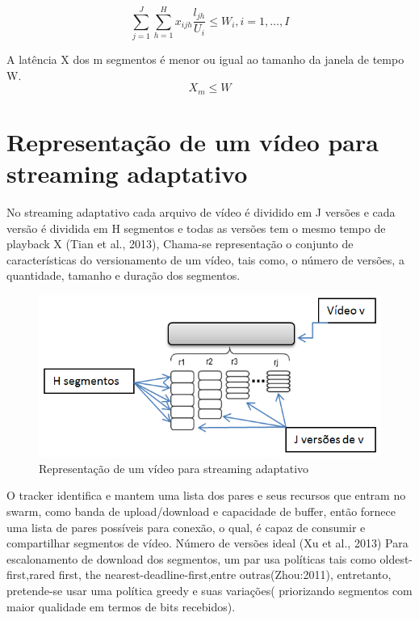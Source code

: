 \documentclass[
	12pt,				%
	oneside,			%
	a4paper,			%
	english,			%
	brazil				%
	]{abntex2ppgsi}
\begin{document}
\begin{equation}
\sum_{j=1}^J\sum_{h=1}^{H}x_{ijh}\frac{l_{jh}}{U_i} \leq W_i ,i = 1, \dots, I
\end{equation}

A latência X dos m segmentos é menor ou igual ao tamanho da janela de tempo W.
\begin{equation}
X_m \leq W
\end{equation}


\section{Representação de um vídeo para streaming adaptativo}

No streaming adaptativo cada arquivo de vídeo é dividido em J versões e cada versão é dividida em H segmentos e todas as versões tem o mesmo tempo de playback X (Tian et al., 2013), Chama-se representação o conjunto de características do versionamento de um vídeo, tais como, o número de versões, a quantidade, tamanho e duração dos segmentos.


\begin{figure}[H]%
	\centering
 	  \caption{Representação de um vídeo para streaming adaptativo}
		\includegraphics{figuras/segmentos.png}
\end{figure}

O tracker identifica e mantem uma lista dos pares e seus recursos que entram no swarm, como banda de upload/download e capacidade de buffer, então fornece uma lista de pares possíveis para conexão, o qual, é capaz de consumir e compartilhar segmentos de vídeo.
Número de versões ideal (Xu et al., 2013)
Para escalonamento de download dos segmentos, um par usa políticas tais como oldest-first,rared first, the nearest-deadline-first,entre outras(Zhou:2011), entretanto, pretende-se usar uma política greedy e suas variações( priorizando segmentos com maior qualidade em termos de bits recebidos).
\end{document}

